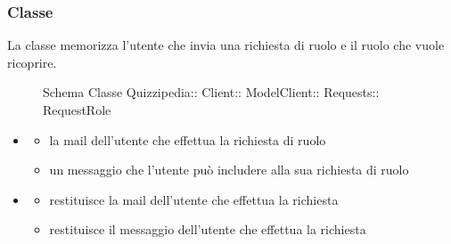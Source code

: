 \subsubsection{Classe }
La classe memorizza l'utente che invia una richiesta di ruolo e il ruolo che vuole ricoprire.
\begin{figure}[H]
\centering
\noindent{}
\caption[Schema Classe RequestRole]{Schema Classe Quizzipedia:: Client:: ModelClient:: Requests:: RequestRole}
\end{figure}
\begin{itemize}
\item {}
\begin{itemize}
\item {}
\newline
la mail dell'utente che effettua la richiesta di ruolo
\item {}
\newline
un messaggio che l'utente può includere alla sua richiesta di ruolo
\end{itemize}
\item {}
\begin{itemize}
\item {}
\newline
restituisce la mail dell'utente che effettua la richiesta
\newline
\item {}
\newline
restituisce il messaggio dell'utente che effettua la richiesta
\newline
\end{itemize}
\end{itemize}
